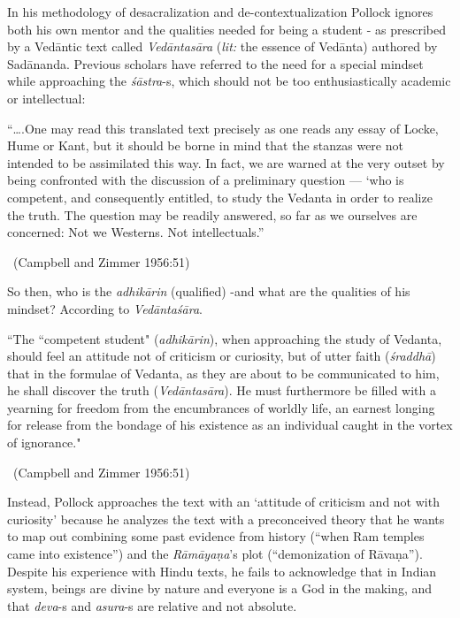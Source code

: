 In his methodology of desacralization and de-contextualization Pollock ignores both his own mentor and the qualities needed for being a student - as prescribed by a Vedāntic text called \textit{Vedāntasāra} (\textit{lit:} the essence of Vedānta) authored by Sadānanda. Previous scholars have referred to the need for a special mindset while approaching the \textit{śāstra}-s, which should not be too enthusiastically academic or intellectual:

\begin{myquote}
“….One may read this translated text precisely as one reads any essay of Locke, Hume or Kant, but it should be borne in mind that the stanzas were not intended to be assimilated this way. In fact, we are warned at the very outset by being confronted with the discussion of a preliminary question — ‘who is competent, and consequently entitled, to study the Vedanta in order to realize the truth. The question may be readily answered, so far as we ourselves are concerned: Not we Westerns. Not intellectuals.” 

\vskip -5pt

~\hfill (Campbell and Zimmer 1956:51)
\end{myquote}

So then, who is the \textit{adhikārin} (qualified) -and what are the qualities of his mindset? According to \textit{Vedāntaśāra}.

\begin{myquote}
“The “competent student" (\textit{adhikārin}), when approaching the study of Vedanta, should feel an attitude not of criticism or curiosity, but of utter faith (\textit{śraddhā}) that in the formulae of Vedanta, as they are about to be communicated to him, he shall discover the truth (\textit{Vedāntasāra}). He must furthermore be filled with a yearning for freedom from the encumbrances of worldly life, an earnest longing for release from the bondage of his existence as an individual caught in the vortex of ignorance." 

\vskip -5pt

~\hfill (Campbell and Zimmer 1956:51)
\end{myquote}

Instead, Pollock approaches the text with an ‘attitude of criticism and not with curiosity’ because he analyzes the text with a preconceived theory that he wants to map out combining some past evidence from history (“when Ram temples came into existence”) and the \textit{Rāmāyaṇa}’s plot (“demonization of Rāvaṇa”). Despite his experience with Hindu texts, he fails to acknowledge that in Indian system, beings are divine by nature and everyone is a God in the making, and that \textit{deva}-s and \textit{asura}-s are relative and not absolute.

